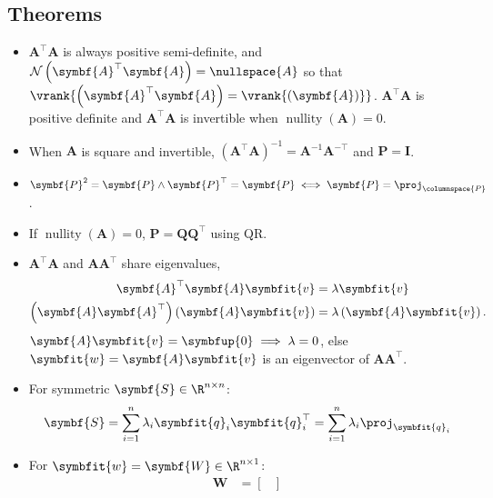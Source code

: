 \documentclass{article}
\DeclareMathOperator*{\nullity}{nullity}
\begin{document}
\begin{multicols*}{3}
    \section{Theorems}
    \begin{itemize}
        \item \(\symbf{A}^\top \symbf{A}\) is always positive semi-definite,
              and \(\mathcal{N}\left( \symbf{A}^\top\symbf{A} \right) = \nullspace{A}\) so that
              \(\vrank{\left( \symbf{A}^\top \symbf{A} \right) = \vrank{\left( \symbf{A} \right)}}\).
              \(\symbf{A}^\top \symbf{A}\) is positive definite and
              \(\symbf{A}^\top \symbf{A}\) is invertible when \(\nullity{\left( \symbf{A} \right)} = 0\).
        \item When \(\symbf{A}\) is square and invertible, \(\left( \symbf{A}^\top \symbf{A} \right)^{-1} = \symbf{A}^{-1} \symbf{A}^{-\top}\) and \(\symbf{P} = \symbf{I}\).
        \item \(\symbf{P}^2 = \symbf{P} \land \symbf{P}^\top = \symbf{P} \iff \symbf{P} = \proj_{\columnspace{P}}\).
        \item If \(\nullity{\left( \symbf{A} \right)} = 0\), \(\symbf{P} = \symbf{Q} \symbf{Q}^\top\) using QR\@.
        \item \(\symbf{A}^\top \symbf{A}\) and \(\symbf{A} \symbf{A}^\top\) share eigenvalues,
              \begin{align*}
                  \symbf{A}^\top \symbf{A} \symbfit{v}                                         & = \lambda \symbfit{v}                           \\
                  \left( \symbf{A} \symbf{A}^\top \right) \left( \symbf{A} \symbfit{v} \right) & = \lambda \left( \symbf{A} \symbfit{v} \right).
              \end{align*}
              \(\symbf{A} \symbfit{v} = \symbfup{0} \implies \lambda = 0\), else \(\symbfit{w} = \symbf{A} \symbfit{v}\) is an eigenvector of \(\symbf{A} \symbf{A}^\top\).
        \item For symmetric \(\symbf{S} \in \R^{n \times n}\):
              \begin{equation*}
                  \symbf{S} = \sum_{i = 1}^n \lambda_i \symbfit{q}_i \symbfit{q}_i^\top = \sum_{i = 1}^n \lambda_i \proj_{\symbfit{q}_i}
              \end{equation*}
        \item For \(\symbfit{w} = \symbf{W} \in \R^{n \times 1}\):
              \begin{align*}
                  \symbf{W}         & = \begin{bmatrix*}

\end{bmatrix*}
\end{align*}
\end{itemize}
\end{multicols*}
\end{document}
